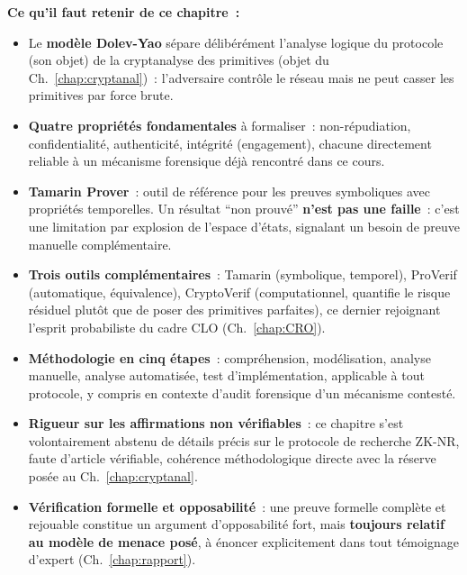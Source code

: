 \begin{boxresume}
\textbf{Ce qu'il faut retenir de ce chapitre~:}
\begin{itemize}
    \item Le \textbf{modèle Dolev-Yao} sépare délibérément l'analyse
          logique du protocole (son objet) de la cryptanalyse des
          primitives (objet du Ch.~\ref{chap:cryptanal})~: l'adversaire
          contrôle le réseau mais ne peut casser les primitives
          par force brute.

    \item \textbf{Quatre propriétés fondamentales} à formaliser~:
          non-répudiation, confidentialité, authenticité, intégrité
          (engagement), chacune directement reliable à un
          mécanisme forensique déjà rencontré dans ce cours.

    \item \textbf{Tamarin Prover}~: outil de référence pour les
          preuves symboliques avec propriétés temporelles. Un
          résultat ``non prouvé'' \textbf{n'est pas une faille}~:
          c'est une limitation par explosion de l'espace d'états,
          signalant un besoin de preuve manuelle complémentaire.

    \item \textbf{Trois outils complémentaires}~: Tamarin
          (symbolique, temporel), ProVerif (automatique,
          équivalence), CryptoVerif (computationnel, quantifie le
          risque résiduel plutôt que de poser des primitives
          parfaites), ce dernier rejoignant l'esprit
          probabiliste du cadre CLO (Ch.~\ref{chap:CRO}).

    \item \textbf{Méthodologie en cinq étapes}~: compréhension,
          modélisation, analyse manuelle, analyse automatisée, test
          d'implémentation, applicable à tout protocole, y
          compris en contexte d'audit forensique d'un mécanisme
          contesté.

    \item \textbf{Rigueur sur les affirmations non vérifiables}~:
          ce chapitre s'est volontairement abstenu de détails
          précis sur le protocole de recherche ZK-NR, faute
          d'article vérifiable, cohérence méthodologique directe
          avec la réserve posée au Ch.~\ref{chap:cryptanal}.

    \item \textbf{Vérification formelle et opposabilité}~: une
          preuve formelle complète et rejouable constitue un
          argument d'opposabilité fort, mais \textbf{toujours
          relatif au modèle de menace posé}, à énoncer
          explicitement dans tout témoignage d'expert
          (Ch.~\ref{chap:rapport}).
\end{itemize}
\end{boxresume}

